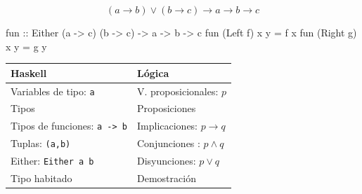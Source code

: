 \documentclass{beamer}
\begin{document}
\begin{frame}[fragile]
  $$(a\rightarrow b) \vee (b\rightarrow c) \rightarrow a \rightarrow b \rightarrow c  $$

  \pause
  
\begin{code}
fun :: Either (a -> c) (b -> c) -> a -> b -> c
fun (Left f)  x y = f x
fun (Right g) x y = g y
\end{code}
\end{frame}

\begin{frame}
\begin{table}[htbp]
\begin{center}
\begin{tabular}{|l|l|}
\hline
Haskell & Lógica \\
\hline \hline
Variables de tipo:  \texttt{a} & V. proposicionales: $p$  \\ \hline
Tipos & Proposiciones \\ \hline
Tipos de funciones: \texttt{a -> b} & Implicaciones: $p\rightarrow q$ \\ \hline
Tuplas: \texttt{(a,b)} & Conjunciones : $p\wedge q$ \\ \hline
Either: \texttt{Either a b} & Disyunciones: $p\vee q$ \\ \hline  
Tipo habitado & Demostración \\ \hline  
\end{tabular}
\end{center}
\end{table}
  

\end{frame}
\end{document}
